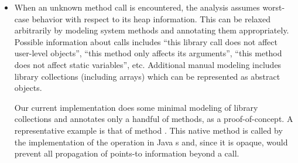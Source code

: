 \begin{itemize}



\item 
When an unknown method
call is encountered, the analysis assumes worst-case behavior with
respect to its heap information. This can be relaxed arbitrarily by
modeling system methods and annotating them appropriately. Possible
information about calls includes ``this library call does not affect
user-level objects'', ``this method only affects its arguments'',
``this method does not affect static variables'', etc.  Additional
manual modeling includes library collections (including arrays) which
can be represented as abstract objects.

Our current implementation does some minimal modeling of library
collections and annotates only a handful of methods, as a
proof-of-concept. A representative example is that of method
. This native method is called by the
implementation of the  operation in Java s and,
since it is opaque, would prevent all propagation of points-to
information beyond a  call.


\end{itemize}
